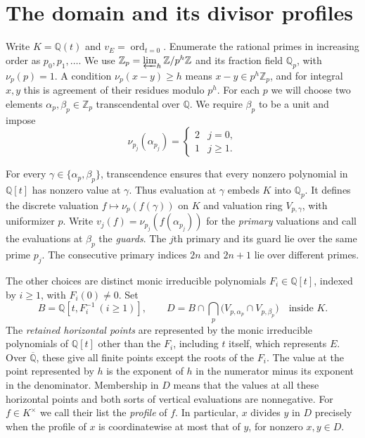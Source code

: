 \section{The domain and its divisor profiles}
\label{sec:profiles}

Write $K = \mathbb{Q}(t)$ and $v_E = \operatorname{ord}_{t = 0}$.
Enumerate the rational primes in increasing order as $p_0, p_1, \ldots$.
We use $\mathbb{Z}_p = \varprojlim_h \mathbb{Z}/p^h\mathbb{Z}$ and its fraction field $\mathbb{Q}_p$, with $\nu_p(p) = 1$.
A condition $\nu_p(x - y) \ge h$ means $x - y \in p^h\mathbb{Z}_p$, and for integral $x, y$ this is agreement of their residues modulo $p^h$.
For each $p$ we will choose two elements $\alpha_p, \beta_p \in \mathbb{Z}_p$ transcendental over $\mathbb{Q}$.
We require $\beta_p$ to be a unit and impose
\[
    \nu_{p_j}(\alpha_{p_j}) =
    \begin{cases}
        2 & j = 0,\\
        1 & j \ge 1.
    \end{cases}
\]

For every $\gamma \in \{\alpha_p, \beta_p\}$, transcendence ensures that every nonzero polynomial in $\mathbb{Q}[t]$ has nonzero value at $\gamma$.
Thus evaluation at $\gamma$ embeds $K$ into $\mathbb{Q}_p$.
It defines the discrete valuation $f \mapsto \nu_p(f(\gamma))$ on $K$ and valuation ring $V_{p, \gamma}$, with uniformizer $p$.
Write $v_j(f) = \nu_{p_j}(f(\alpha_{p_j}))$ for the \emph{primary} valuations and call the evaluations at $\beta_p$ the \emph{guards}.
The $j$th primary and its guard lie over the same prime $p_j$.
The consecutive primary indices $2n$ and $2n + 1$ lie over different primes.

The other choices are distinct monic irreducible polynomials $F_i \in \mathbb{Q}[t]$, indexed by $i \ge 1$, with $F_i(0) \ne 0$.
Set
\begin{equation}
    \label{eq:ring}
    B = \mathbb{Q}[t, F_i^{-1} \ (i \ge 1)],
    \qquad
    D = B \cap \bigcap_p \bigl(V_{p, \alpha_p} \cap V_{p, \beta_p}\bigr)
    \quad \text{inside } K.
\end{equation}
The \emph{retained horizontal points} are represented by the monic irreducible polynomials of $\mathbb{Q}[t]$ other than the $F_i$, including $t$ itself, which represents $E$.
Over $\overline{\mathbb{Q}}$, these give all finite points except the roots of the $F_i$.
The value at the point represented by $h$ is the exponent of $h$ in the numerator minus its exponent in the denominator.
Membership in $D$ means that the values at all these horizontal points and both sorts of vertical evaluations are nonnegative.
For $f \in K^{\times}$ we call their list the \emph{profile} of $f$.
In particular, $x$ divides $y$ in $D$ precisely when the profile of $x$ is coordinatewise at most that of $y$, for nonzero $x, y \in D$.

